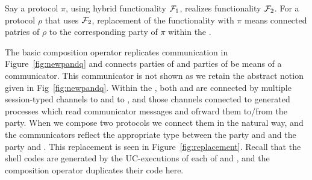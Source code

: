 Say a protocol $\pi$, using hybrid functionality $\mathcal{F}_1$, realizes functionality $\mathcal{F}_2$. 
For a protocol $\rho$ that uses $\mathcal{F}_2$, replacement of the functionality with $\pi$ means connected patries of $\rho$ to the corresponding party of $\pi$ within the \partywrapper.

The basic composition operator replicates communication in Figure~\ref{fig:newpandq} and connects parties of \RHO and parties of \PI be means of a communicator. This communicator is not shown as we retain the abstract notion given in Fig~\ref{fig:newpandq}.
Within the \partywrapper, both \RHO and \PI are connected by multiple session-typed channels to \Z and to \F, and those channels connected to generated processes which read communicator messages and ofrward them to/from the party.
When we compose two protocols we connect them in the natural way, and the communicators reflect the appropriate type between the party and \Z and the party and \F. This replacement is seen in Figure~\ref{fig:replacement}.
Recall that the shell codes are generated by the UC-executions of each of \RHO and \PI, and the composition operator duplicates their code here.

%


